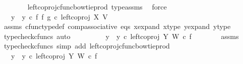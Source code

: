 \begin{isabellebody}
\ \ \ \ \ \ \isamarkupfalse%
\ left{\isacharunderscore}{\kern0pt}coproj{\isacharunderscore}{\kern0pt}cfunc{\isacharunderscore}{\kern0pt}bowtie{\isacharunderscore}{\kern0pt}prod\ type{\isacharunderscore}{\kern0pt}assms\ \isamarkupfalse%
\ force\isanewline
\ \ \ \ \isamarkupfalse%
\ \isamarkupfalse%
\ {\isachardoublequoteopen}{\isachardot}{\kern0pt}{\isachardot}{\kern0pt}{\isachardot}{\kern0pt}\ {\isacharequal}{\kern0pt}\ {\isacharparenleft}{\kern0pt}y{}\ {\isasymamalg}\ y{}{\isacharparenright}{\kern0pt}\ {\isasymcirc}\isactrlsub c\ {\isacharparenleft}{\kern0pt}f\ {\isasymbowtie}\isactrlsub f\ g{\isacharparenright}{\kern0pt}\ {\isasymcirc}\isactrlsub c\ left{\isacharunderscore}{\kern0pt}coproj\ X\ V{\isachardoublequoteclose}\isanewline
\ \ \ \ \ \ \isamarkupfalse%
\ assms\ cfunc{\isacharunderscore}{\kern0pt}type{\isacharunderscore}{\kern0pt}def\ comp{\isacharunderscore}{\kern0pt}associative\ eqs\ x{\isacharunderscore}{\kern0pt}expand\ x{\isacharunderscore}{\kern0pt}type\ y{\isacharunderscore}{\kern0pt}expand\ y{\isacharunderscore}{\kern0pt}type\ \isamarkupfalse%
\ {\isacharparenleft}{\kern0pt}typecheck{\isacharunderscore}{\kern0pt}cfuncs{\isacharcomma}{\kern0pt}\ auto{\isacharparenright}{\kern0pt}\isanewline
\ \ \ \ \isamarkupfalse%
\ \isamarkupfalse%
\ {\isachardoublequoteopen}{\isachardot}{\kern0pt}{\isachardot}{\kern0pt}{\isachardot}{\kern0pt}\ {\isacharequal}{\kern0pt}\ {\isacharparenleft}{\kern0pt}y{}\ {\isasymamalg}\ y{}{\isacharparenright}{\kern0pt}\ {\isasymcirc}\isactrlsub c\ left{\isacharunderscore}{\kern0pt}coproj\ Y\ W\ {\isasymcirc}\isactrlsub c\ f{\isachardoublequoteclose}\isanewline
\ \ \ \ \ \ \isamarkupfalse%
\ assms\ \isamarkupfalse%
\ {\isacharparenleft}{\kern0pt}typecheck{\isacharunderscore}{\kern0pt}cfuncs{\isacharcomma}{\kern0pt}\ simp\ add{\isacharcolon}{\kern0pt}\ left{\isacharunderscore}{\kern0pt}coproj{\isacharunderscore}{\kern0pt}cfunc{\isacharunderscore}{\kern0pt}bowtie{\isacharunderscore}{\kern0pt}prod{\isacharparenright}{\kern0pt}\isanewline
\ \ \ \ \isamarkupfalse%
\ \isamarkupfalse%
\ {\isachardoublequoteopen}{\isachardot}{\kern0pt}{\isachardot}{\kern0pt}{\isachardot}{\kern0pt}\ {\isacharequal}{\kern0pt}\ {\isacharparenleft}{\kern0pt}{\isacharparenleft}{\kern0pt}y{}\ {\isasymamalg}\ y{}{\isacharparenright}{\kern0pt}\ {\isasymcirc}\isactrlsub c\ left{\isacharunderscore}{\kern0pt}coproj\ Y\ W{\isacharparenright}{\kern0pt}\ {\isasymcirc}\isactrlsub c\ f{\isachardoublequoteclose}\isanewline

\end{isabellebody}
